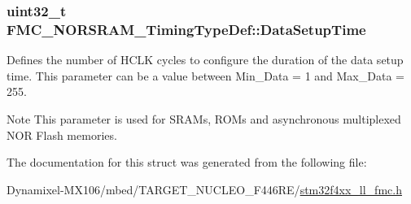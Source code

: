 \subsubsection[{\texorpdfstring{Data\+Setup\+Time}{DataSetupTime}}]{\setlength{\rightskip}{0pt plus 5cm}uint32\+\_\+t F\+M\+C\+\_\+\+N\+O\+R\+S\+R\+A\+M\+\_\+\+Timing\+Type\+Def\+::\+Data\+Setup\+Time}\hypertarget{struct_f_m_c___n_o_r_s_r_a_m___timing_type_def_a6d98531021e36edf901d6cb01d6adaaa}{}\label{struct_f_m_c___n_o_r_s_r_a_m___timing_type_def_a6d98531021e36edf901d6cb01d6adaaa}
Defines the number of H\+C\+LK cycles to configure the duration of the data setup time. This parameter can be a value between Min\+\_\+\+Data = 1 and Max\+\_\+\+Data = 255. \begin{DoxyNote}{Note}
This parameter is used for S\+R\+A\+Ms, R\+O\+Ms and asynchronous multiplexed N\+OR Flash memories. 
\end{DoxyNote}


The documentation for this struct was generated from the following file\+:\begin{DoxyCompactItemize}
\item 
Dynamixel-\/\+M\+X106/mbed/\+T\+A\+R\+G\+E\+T\+\_\+\+N\+U\+C\+L\+E\+O\+\_\+\+F446\+R\+E/\hyperlink{stm32f4xx__ll__fmc_8h}{stm32f4xx\+\_\+ll\+\_\+fmc.\+h}\end{DoxyCompactItemize}
